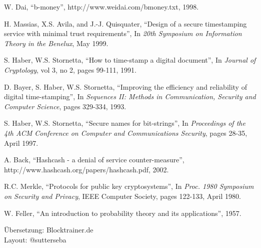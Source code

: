\documentclass[9pt]{article}
\begin{document}
	\begin{thebibliography}{8}
	
		W. Dai, \enquote{b-money}, http://www.weidai.com/bmoney.txt, 1998.
		
		H. Massias, X.S. Avila, and J.-J. Quisquater, \enquote{Design of a secure timestamping service with minimal trust requirements}, In \emph{20th Symposium on Information Theory in the Benelux}, May 1999.
		
		S. Haber, W.S. Stornetta, \enquote{How to time-stamp a digital document}, In \emph{Journal of Cryptology}, vol 3, no 2, pages 99-111, 1991.
		
		D. Bayer, S. Haber, W.S. Stornetta, \enquote{Improving the efficiency and reliability of digital time-stamping}, In \emph{Sequences II: Methods in Communication, Security and Computer Science}, pages 329-334, 1993.
		
		S. Haber, W.S. Stornetta, \enquote{Secure names for bit-strings}, In \emph{Proceedings of the 4th ACM Conference on Computer and Communications Security}, pages 28-35, April 1997.
		
		A. Back, \enquote{Hashcash - a denial of service counter-measure}, \\http://www.hashcash.org/papers/hashcash.pdf, 2002.
		
		R.C. Merkle, \enquote{Protocols for public key cryptosystems}, In \emph{Proc. 1980 Symposium on Security and Privacy}, IEEE Computer Society, pages 122-133, April 1980.
		
		W. Feller, \enquote{An introduction to probability theory and its applications}, 1957.
	\end{thebibliography}
	
	\vfill
	\begin{center}
		\scriptsize{Übersetzung: Blocktrainer.de\\ \smallskip Layout: @sutterseba}
	\end{center}
\end{document}
